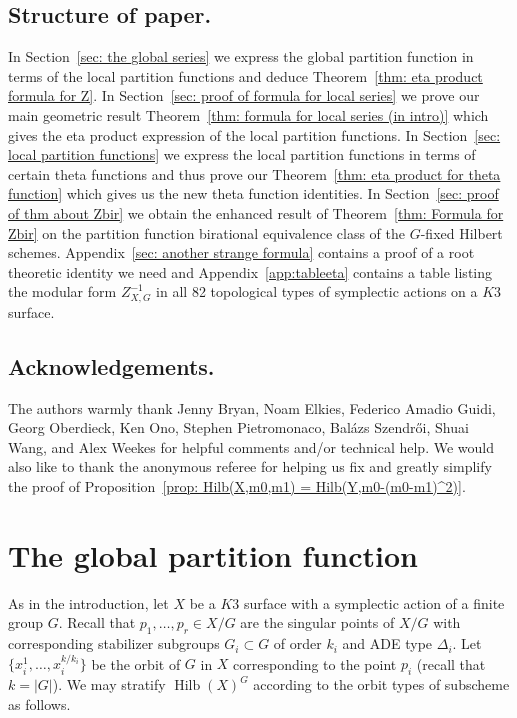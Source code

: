 \documentclass{amsart}
\theoremstyle{definition}
\newcommand{\Hilb}{\operatorname{Hilb}}
\newcommand{\jim}{\color{red}}
\begin{document}
\subsection{Structure of paper. }  In Section~\ref{sec: the global
series} we express the global partition function in terms of the local
partition functions and deduce Theorem~\ref{thm: eta product formula
for Z}. In Section~\ref{sec: proof of formula for local series} we
prove our main geometric result Theorem~\ref{thm: formula for local
series (in intro)} which gives the eta product expression of the local
partition functions. In Section~\ref{sec: local partition functions}
we express the local partition functions in terms of certain theta
functions and thus prove our Theorem~\ref{thm: eta product for theta
function} which gives us the new theta function identities. In
Section~\ref{sec: proof of thm about Zbir} we obtain the enhanced
result of Theorem~\ref{thm: Formula for Zbir} on the partition
function birational equivalence class of the $G$-fixed Hilbert
schemes. Appendix~\ref{sec: another strange formula} contains a proof
of a root theoretic identity we need and Appendix~\ref{app:tableeta}
contains a table listing the modular form $Z^{-1}_{X,G}$ in all 82
topological types of symplectic actions on a $K3$ surface.


\subsection{Acknowledgements.} The authors warmly thank Jenny Bryan,
Noam Elkies, Federico Amadio Guidi, Georg Oberdieck, Ken Ono, Stephen
Pietromonaco, Bal\'azs Szendr\H{o}i, Shuai Wang, and Alex Weekes for
helpful comments and/or technical help.  {\jim We would also like to
thank the anonymous referee for helping us fix and greatly simplify
the proof of Proposition~\ref{prop: Hilb(X,m0,m1) =
Hilb(Y,m0-(m0-m1)^2)}. }


\section{The global partition function}\label{sec: the global series}

As in the introduction, let $X$ be a $K3$ surface with a symplectic
action of a finite group $G$.  Recall that $p_{1},\dotsc ,p_{r}\in
X/G$ are the singular points of $X/G$ with corresponding stabilizer
subgroups $G_{i}\subset G$ of order $k_{i}$ and ADE type
$\Delta_{i}$. Let $\{x_{i}^{1},\dotsc ,x_{i}^{k/k_{i}} \}$ be the
orbit of $G$ in $X$ corresponding to the point $p_{i}$ (recall that
$k=|G|$).  We may stratify $\Hilb (X)^{G}$ according to the orbit
types of subscheme as follows.
\end{document}
